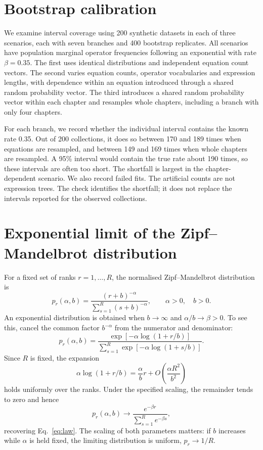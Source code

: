 \documentclass[10pt]{article}
\begin{document}
\section{Bootstrap calibration}\label{app:calibration}
We examine interval coverage using 200 synthetic datasets in each of three scenarios, each with seven branches and 400 bootstrap replicates. All scenarios have population marginal operator frequencies following an exponential with rate $\beta=0.35$. The first uses identical distributions and independent equation count vectors. The second varies equation counts, operator vocabularies and expression lengths, with dependence within an equation introduced through a shared random probability vector. The third introduces a shared random probability vector within each chapter and resamples whole chapters, including a branch with only four chapters.

For each branch, we record whether the individual interval contains the known rate 0.35. Out of 200 collections, it does so between 170 and 189 times when equations are resampled, and between 149 and 169 times when whole chapters are resampled. A 95\% interval would contain the true rate about 190 times, so these intervals are often too short. The shortfall is largest in the chapter-dependent scenario. We also record failed fits. The artificial counts are not expression trees. The check identifies the shortfall; it does not replace the intervals reported for the observed collections.

\section{Exponential limit of the Zipf--Mandelbrot distribution}\label{app:zipf-limit}
For a fixed set of ranks $r=1,\ldots,R$, the normalised Zipf--Mandelbrot distribution is
\begin{equation}
p_r(\alpha,b)=\frac{(r+b)^{-\alpha}}{\sum_{s=1}^{R}(s+b)^{-\alpha}},
\qquad \alpha>0,\quad b>0.
\end{equation}
An exponential distribution is obtained when $b\to\infty$ and $\alpha/b\to\beta>0$. To see this, cancel the common factor $b^{-\alpha}$ from the numerator and denominator:
\begin{equation}
p_r(\alpha,b)=\frac{\exp[-\alpha\log(1+r/b)]}{\sum_{s=1}^{R}\exp[-\alpha\log(1+s/b)]}.
\end{equation}
Since $R$ is fixed, the expansion
\begin{equation}
\alpha\log(1+r/b)=\frac{\alpha}{b}r+O\!\left(\frac{\alpha R^2}{b^2}\right)
\end{equation}
holds uniformly over the ranks. Under the specified scaling, the remainder tends to zero and hence
\begin{equation}
p_r(\alpha,b)\longrightarrow\frac{e^{-\beta r}}{\sum_{s=1}^{R}e^{-\beta s}},
\end{equation}
recovering Eq.~\eqref{eq:law}. The scaling of both parameters matters: if $b$ increases while $\alpha$ is held fixed, the limiting distribution is uniform, $p_r\to1/R$.
\end{document}
